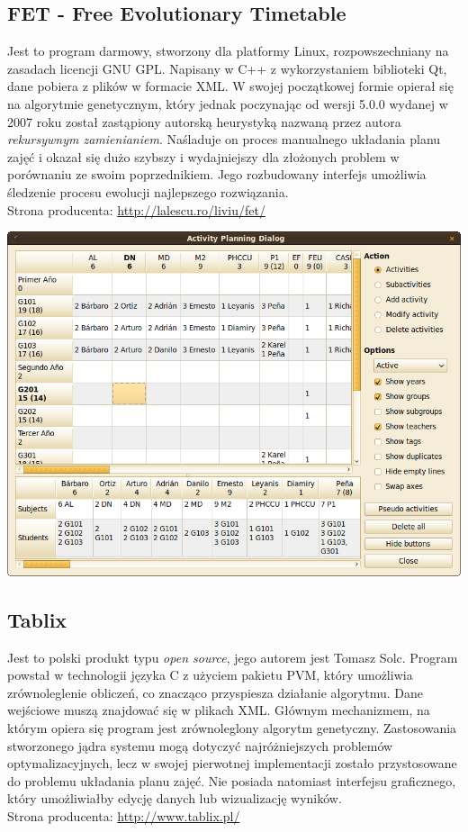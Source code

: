 \subsection{FET - Free Evolutionary Timetable}
Jest to program darmowy, stworzony dla platformy Linux, rozpowszechniany na zasadach licencji GNU GPL. Napisany w C++ z wykorzystaniem biblioteki Qt, dane pobiera z plików w formacie XML. W swojej początkowej formie opierał się na algorytmie genetycznym, który jednak poczynając od wersji 5.0.0 wydanej w 2007 roku został zastąpiony autorską heurystyką nazwaną przez autora \emph{rekursywnym zamienianiem}. Naśladuje on proces manualnego układania planu zajęć i okazał się dużo szybszy i wydajniejszy dla złożonych problem w porównaniu ze swoim poprzednikiem. Jego rozbudowany interfejs umożliwia śledzenie procesu ewolucji najlepszego rozwiązania. \\
Strona producenta: \url{http://lalescu.ro/liviu/fet/}
\begin{center}
\includegraphics[width=15cm]{img/FET.png}
\end{center}
\subsection{Tablix}
Jest to polski produkt typu \emph{open source}, jego autorem jest Tomasz Solc. Program powstał w technologii języka C z użyciem pakietu PVM, który umożliwia zrównoleglenie obliczeń, co znacząco przyspiesza działanie algorytmu. Dane wejściowe muszą znajdować się w plikach XML. Głównym mechanizmem, na którym opiera się program jest zrównoleglony algorytm genetyczny. Zastosowania stworzonego jądra systemu mogą dotyczyć najróżniejszych problemów optymalizacyjnych, lecz w swojej pierwotnej implementacji zostało przystosowane do problemu układania planu zajęć. Nie posiada natomiast interfejsu graficznego, który umożliwiałby edycję danych lub wizualizację wyników. \\
Strona producenta: \url{http://www.tablix.pl/}